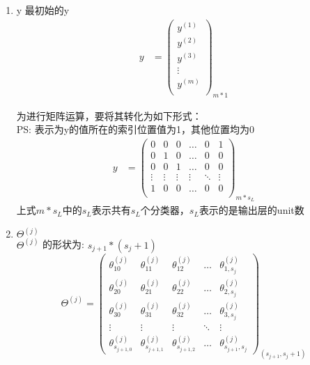 \begin{enumerate}
\item y
最初始的y
\begin{equation} \begin{aligned}
	y & = \left(\begin{matrix}
			y^{(1)} \\ y^{(2)} \\ y^{(3)} \\ \vdots \\ y^{(m)} \\
		\end{matrix}\right)_{m*1}
\end{aligned} \end{equation}

为进行矩阵运算，要将其转化为如下形式：\\
PS: 表示为y的值所在的索引位置值为1，其他位置均为0
\begin{equation}\begin{aligned}
	y &= \left(\begin{matrix}
	        0 & 0 & 0 & \dots & 0 & 1 \\
	        0 & 1 & 0 & \dots & 0 & 0 \\
	        0 & 0 & 1 & \dots & 0 & 0 \\
	        \vdots & \vdots & \vdots & \vdots & \ddots & \vdots \\
	        1 & 0 & 0 & \dots & 0 & 0 \\
		\end{matrix}\right)_{m*s_L}
\end{aligned}\end{equation}
上式$m*s_L$中的$s_L$表示共有$s_L$个分类器，$s_L$表示的是输出层的unit数


\item $\Theta^{(j)}$  \\

$\Theta^{(j)}$ 的形状为: $s_{j+1}*(s_j+1)$ \\

\begin{equation}
\Theta^{(j)} = 
	\left(\begin{matrix}
		\theta_{10}^{(j)} & \theta_{11}^{(j)} & \theta_{12}^{(j)} & \dots & \theta_{1,s_j}^{(j)} \\
		\theta_{20}^{(j)} & \theta_{21}^{(j)} & \theta_{22}^{(j)} & \dots & \theta_{2,s_j}^{(j)} \\
		\theta_{30}^{(j)} & \theta_{31}^{(j)} & \theta_{32}^{(j)} & \dots & \theta_{3,s_j}^{(j)} \\
		\vdots    & \vdots    & \vdots    & \ddots & \vdots   \\
		\theta_{s_{j+1,0}}^{(j)} & \theta_{s_{j+1,1}}^{(j)} & \theta_{s_{j+1,2}}^{(j)} & \dots & \theta_{s_{j+1},s_j}^{(j)}
	\end{matrix}\right)_{(s_{j+1},s_j+1)}
\end{equation}




\end{enumerate}



